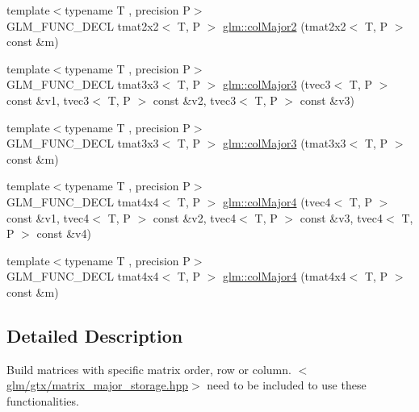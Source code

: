 \begin{DoxyCompactItemize}
\item 
{\footnotesize template$<$typename T , precision P$>$ }\\G\-L\-M\-\_\-\-F\-U\-N\-C\-\_\-\-D\-E\-C\-L tmat2x2$<$ T, P $>$ \hyperlink{group__gtx__matrix__major__storage_ga5cfd25de9d5b4c6a825085f38ddfeff7}{glm\-::col\-Major2} (tmat2x2$<$ T, P $>$ const \&m)
\item 
{\footnotesize template$<$typename T , precision P$>$ }\\G\-L\-M\-\_\-\-F\-U\-N\-C\-\_\-\-D\-E\-C\-L tmat3x3$<$ T, P $>$ \hyperlink{group__gtx__matrix__major__storage_ga3a55e2948193e91733e434e7cc3c1540}{glm\-::col\-Major3} (tvec3$<$ T, P $>$ const \&v1, tvec3$<$ T, P $>$ const \&v2, tvec3$<$ T, P $>$ const \&v3)
\item 
{\footnotesize template$<$typename T , precision P$>$ }\\G\-L\-M\-\_\-\-F\-U\-N\-C\-\_\-\-D\-E\-C\-L tmat3x3$<$ T, P $>$ \hyperlink{group__gtx__matrix__major__storage_gaa93f3dcc47ced18e5db4a853363d9386}{glm\-::col\-Major3} (tmat3x3$<$ T, P $>$ const \&m)
\item 
{\footnotesize template$<$typename T , precision P$>$ }\\G\-L\-M\-\_\-\-F\-U\-N\-C\-\_\-\-D\-E\-C\-L tmat4x4$<$ T, P $>$ \hyperlink{group__gtx__matrix__major__storage_ga2829de096bb67ab5cd670958f3d402b6}{glm\-::col\-Major4} (tvec4$<$ T, P $>$ const \&v1, tvec4$<$ T, P $>$ const \&v2, tvec4$<$ T, P $>$ const \&v3, tvec4$<$ T, P $>$ const \&v4)
\item 
{\footnotesize template$<$typename T , precision P$>$ }\\G\-L\-M\-\_\-\-F\-U\-N\-C\-\_\-\-D\-E\-C\-L tmat4x4$<$ T, P $>$ \hyperlink{group__gtx__matrix__major__storage_ga7592acfd27da055e2d7c39564cf8803d}{glm\-::col\-Major4} (tmat4x4$<$ T, P $>$ const \&m)
\end{DoxyCompactItemize}


\subsection{Detailed Description}
Build matrices with specific matrix order, row or column. $<$\hyperlink{matrix__major__storage_8hpp}{glm/gtx/matrix\-\_\-major\-\_\-storage.\-hpp}$>$ need to be included to use these functionalities. 

